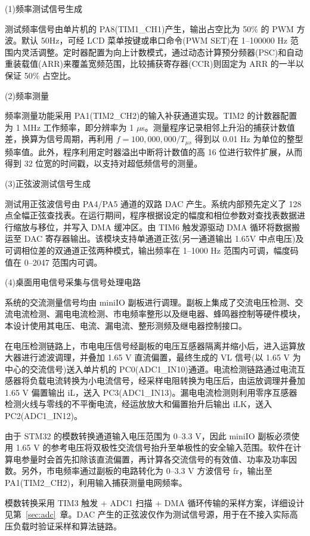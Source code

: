 \documentclass[UTF8,a4paper,zihao=-4,fontset=macnew]{ctexart}
\newcommand{\itemline}[2]{%
  {\setlength{\leftskip}{2em}\setlength{\parindent}{0pt}%
  \noindent(#1)\quad #2\par}%
}
\begin{document}
\itemline{1}{频率测试信号生成}

测试频率信号由单片机的 PA8(TIM1\_CH1)产生，输出占空比为 50\% 的 PWM 方波。默认 50Hz，可经 LCD 菜单按键或串口命令(PWM SET)在 1--100000 Hz 范围内灵活调整。定时器配置为向上计数模式，通过动态计算预分频器(PSC)和自动重装载值(ARR)来覆盖宽频范围，比较捕获寄存器(CCR)则固定为 ARR 的一半以保证 50\% 占空比。

\itemline{2}{频率测量}

频率测量功能采用 PA1(TIM2\_CH2)的输入补获通道实现。TIM2 的计数器配置为 1 MHz 工作频率，即分辨率为 1 $\mu$s。测量程序记录相邻上升沿的捕获计数值差，换算为信号周期，再利用 $f = 100{,}000{,}000 / T_{\mu s}$ 得到以 0.01 Hz 为单位的整型频率值。此外，程序利用定时器溢出中断将计数值的高 16 位进行软件扩展，从而得到 32 位宽的时间戳，以支持对超低频信号的测量。

\itemline{3}{正弦波测试信号生成}

测试用正弦波信号由 PA4/PA5 通道的双路 DAC 产生。系统内部预先定义了 128 点全幅正弦查找表。在运行期间，程序根据设定的幅度和相位参数对查找表数据进行缩放与移位，并写入 DMA 缓冲区。由 TIM6 触发源驱动 DMA 循环将数据搬运至 DAC 寄存器输出。该模块支持单通道正弦(另一通道输出 1.65V 中点电压)及可调相位差的双通道正弦两种模式，输出频率在 1--1000 Hz 范围内可调，幅度码值在 0--2047 范围内可调。

\itemline{4}{桌面用电信号采集与信号处理电路}

系统的交流测量信号均由 miniIO 副板进行调理。副板上集成了交流电压检测、交流电流检测、漏电电流检测、市电频率整形以及继电器、蜂鸣器控制等硬件模块，本设计使用其电压、电流、漏电流、整形测频及继电器控制接口。

在电压检测链路上，市电电压信号经副板的电压互感器隔离并缩小后，进入运算放大器进行滤波调理，并叠加 1.65 V 直流偏置，最终生成的 VL 信号(以 1.65 V 为中心的交流信号)送入单片机的 PC0(ADC1\_IN10)通道。电流检测链路通过电流互感器将负载电流转换为小电流信号，经采样电阻转换为电压后，由运放调理并叠加 1.65 V 偏置输出 iL，送入 PC3(ADC1\_IN13)。漏电电流检测则利用零序互感器检测火线与零线的不平衡电流，经运放放大和偏置抬升后输出 iLK，送入 PC2(ADC1\_IN12)。

由于 STM32 的模数转换通道输入电压范围为 0--3.3 V，因此 miniIO 副板必须使用 1.65 V 的参考电压将双极性交流信号抬升至单极性的安全输入范围。软件在计算电参量时会首先扣除该直流偏置，再计算各交流信号的有效值、功率及功率因数。另外，市电频率通过副板的电路转化为 0--3.3 V 方波信号 fr，输出至 PA1(TIM2\_CH2)，利用输入捕获测量电网频率。

模数转换采用 TIM3 触发 + ADC1 扫描 + DMA 循环传输的采样方案，详细设计见第~\ref{sec:adc}~章。DAC 产生的正弦波仅作为测试信号源，用于在不接入实际高压负载时验证采样和算法链路。
\end{document}
